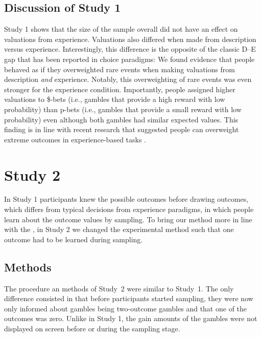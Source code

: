 \documentclass[a4paper, man, natbib, floatsintext]{apa6}
\begin{document}

\clearpage

\subsection{Discussion of Study 1}

Study 1 shows that the size of the sample overall did not have an effect on valuations from experience.  Valuations also differed when made from description versus experience. Interestingly, this difference is the opposite of the classic D--E gap that has been reported in choice paradigms: We found evidence that people behaved as if they overweighted rare events when making valuations from description \textit{and} experience. Notably, this overweighting of rare events was even stronger for the experience condition. Importantly, people assigned higher valuations to \$-bets (i.e., gambles that provide a high reward with low probability) than p-bets (i.e., gambles that provide a small reward with low probability) even although both gambles had similar expected values. This finding is in line with recent research that suggested people can overweight extreme outcomes in experience-based tasks \citep{Ludvig2017} .

\section{Study 2}
In Study 1 participants knew the possible outcomes before drawing outcomes, which differs from typical decisions from experience paradigms, in which people learn about the outcome values by sampling. To bring our method more in line with the , in Study 2 we changed the experimental method such that one outcome had to be learned during sampling.

\subsection{Methods}
The procedure an methods of Study~2 were similar to Study~1. The only difference consisted in that before participants started sampling, they were now only informed about gambles being two-outcome gambles and that one of the outcomes was zero. Unlike in Study 1, the gain amounts of the gambles were not displayed on screen before or during the sampling stage.
\end{document}
